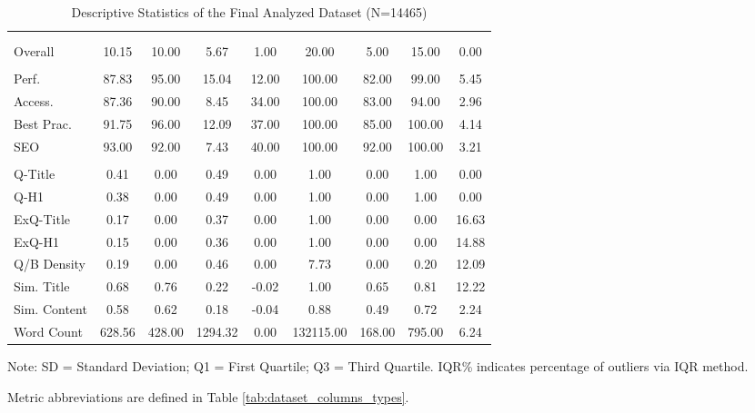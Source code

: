 \begin{table}[htbp!]
\centering
\begin{threeparttable}
\caption{Descriptive Statistics of the Final Analyzed Dataset (N=\num{14465})}
\label{tab:comprehensive_stats}
\small
\setlength{\tabcolsep}{3pt}
\renewcommand{\arraystretch}{1}
\begin{tabular*}{\textwidth}{l@{\extracolsep{\fill}}S[table-format=3.2]S[table-format=3.2]S[table-format=4.2]S[table-format=3.2]S[table-format=6.2]S[table-format=3.2]S[table-format=3.2]S[table-format=2.2]}
\toprule
{} &  &  &  &  &  &  &  &  \\
\dmidrule
{} \\
Overall & 10.15 & 10.00 & 5.67 & 1.00 & 20.00 & 5.00 & 15.00 & 0.00 \\
\midrule
{} \\
Perf. & 87.83 & 95.00 & 15.04 & 12.00 & 100.00 & 82.00 & 99.00 & 5.45 \\
Access. & 87.36 & 90.00 & 8.45 & 34.00 & 100.00 & 83.00 & 94.00 & 2.96 \\
Best Prac. & 91.75 & 96.00 & 12.09 & 37.00 & 100.00 & 85.00 & 100.00 & 4.14 \\
SEO & 93.00 & 92.00 & 7.43 & 40.00 & 100.00 & 92.00 & 100.00 & 3.21 \\
\midrule
{} \\
Q-Title & 0.41 & 0.00 & 0.49 & 0.00 & 1.00 & 0.00 & 1.00 & 0.00 \\
Q-H1 & 0.38 & 0.00 & 0.49 & 0.00 & 1.00 & 0.00 & 1.00 & 0.00 \\
ExQ-Title & 0.17 & 0.00 & 0.37 & 0.00 & 1.00 & 0.00 & 0.00 & 16.63 \\
ExQ-H1 & 0.15 & 0.00 & 0.36 & 0.00 & 1.00 & 0.00 & 0.00 & 14.88 \\
Q/B Density & 0.19 & 0.00 & 0.46 & 0.00 & 7.73 & 0.00 & 0.20 & 12.09 \\
Sim. Title & 0.68 & 0.76 & 0.22 & -0.02 & 1.00 & 0.65 & 0.81 & 12.22 \\
Sim. Content & 0.58 & 0.62 & 0.18 & -0.04 & 0.88 & 0.49 & 0.72 & 2.24 \\
Word Count & 628.56 & 428.00 & 1294.32 & 0.00 & 132115.00 & 168.00 & 795.00 & 6.24 \\
\bottomrule
\end{tabular*}
\begin{tablenotes}[flushleft]
\scriptsize
\item Note: SD = Standard Deviation; Q1 = First Quartile; Q3 = Third Quartile. IQR\% indicates percentage of outliers via IQR method.
\item Metric abbreviations are defined in Table \ref{tab:dataset_columns_types}.
\end{tablenotes}
\end{threeparttable}
\end{table}
